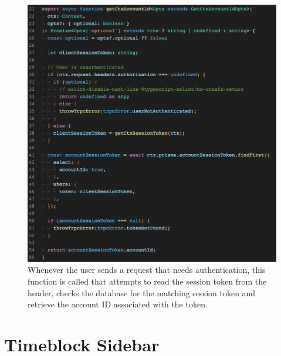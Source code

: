 \documentclass[notitlepage, 12pt]{report}
\begin{document}
\begin{figure}[H]
	\caption{Whenever the user sends a request that needs authentication, this function is called that attempts to read the session token from the header, checks the database for the matching session token and retrieve the account ID associated with the token.}
	\includegraphics[width=\textwidth]{authentication.png}
\end{figure}

\newpage

\section*{Timeblock Sidebar}
\end{document}
